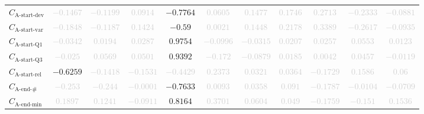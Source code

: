 \documentclass{standalone}
\newcommand{\startactivitiesrelname}{\text{A-start-rel}}
\newcommand{\startactivitiesrel}{C_{\startactivitiesrelname}}
\newcommand{\startdevname}{\text{A-start-dev}}
\newcommand{\startdev}{C_{\startdevname}}
\newcommand{\startvarname}{\text{A-start-var}}
\newcommand{\startvar}{C_{\startvarname}}
\newcommand{\startqonename}{\text{A-start-Q1}}
\newcommand{\startqone}{C_{\startqonename}}
\newcommand{\startqthreename}{\text{A-start-Q3}}
\newcommand{\startqthree}{C_{\startqthreename}}
\newcommand{\lastactivitiesname}{\text{A-end-\#}}
\newcommand{\lastactivities}{C_{\lastactivitiesname}}
\newcommand{\lastminname}{\text{A-end-min}}
\newcommand{\lastmin}{C_{\lastminname}}
\begin{document}
\begin{tabular}{lcccccccccc}
$\startdev$ & \textcolor{lightgray}{$-0.1467$} & \textcolor{lightgray}{$-0.1199$} & \textcolor{lightgray}{$0.0914$} & $-0.7764$ & \textcolor{lightgray}{$0.0605$} & \textcolor{lightgray}{$0.1477$} & \textcolor{lightgray}{$0.1746$} & \textcolor{lightgray}{$0.2713$} & \textcolor{lightgray}{$-0.2333$} & \textcolor{lightgray}{$-0.0881$} \\ 
$\startvar$ & \textcolor{lightgray}{$-0.1848$} & \textcolor{lightgray}{$-0.1187$} & \textcolor{lightgray}{$0.1424$} & $-0.59$ & \textcolor{lightgray}{$0.0021$} & \textcolor{lightgray}{$0.1448$} & \textcolor{lightgray}{$0.2178$} & \textcolor{lightgray}{$0.3389$} & \textcolor{lightgray}{$-0.2617$} & \textcolor{lightgray}{$-0.0935$} \\ 
$\startqone$ & \textcolor{lightgray}{$-0.0342$} & \textcolor{lightgray}{$0.0194$} & \textcolor{lightgray}{$0.0287$} & $0.9754$ & \textcolor{lightgray}{$-0.0996$} & \textcolor{lightgray}{$-0.0315$} & \textcolor{lightgray}{$0.0207$} & \textcolor{lightgray}{$0.0257$} & \textcolor{lightgray}{$0.0553$} & \textcolor{lightgray}{$0.0123$} \\ 
$\startqthree$ & \textcolor{lightgray}{$-0.025$} & \textcolor{lightgray}{$0.0569$} & \textcolor{lightgray}{$0.0501$} & $0.9392$ & \textcolor{lightgray}{$-0.172$} & \textcolor{lightgray}{$-0.0879$} & \textcolor{lightgray}{$0.0185$} & \textcolor{lightgray}{$0.0042$} & \textcolor{lightgray}{$0.0457$} & \textcolor{lightgray}{$-0.0119$} \\ 
$\startactivitiesrel$ & $-0.6259$ & \textcolor{lightgray}{$-0.1418$} & \textcolor{lightgray}{$-0.1531$} & \textcolor{lightgray}{$-0.4429$} & \textcolor{lightgray}{$0.2373$} & \textcolor{lightgray}{$0.0321$} & \textcolor{lightgray}{$0.0364$} & \textcolor{lightgray}{$-0.1729$} & \textcolor{lightgray}{$0.1586$} & \textcolor{lightgray}{$0.06$} \\ 
$\lastactivities$ & \textcolor{lightgray}{$-0.253$} & \textcolor{lightgray}{$-0.244$} & \textcolor{lightgray}{$-0.0001$} & $-0.7633$ & \textcolor{lightgray}{$0.0093$} & \textcolor{lightgray}{$0.0358$} & \textcolor{lightgray}{$0.091$} & \textcolor{lightgray}{$-0.1787$} & \textcolor{lightgray}{$-0.0104$} & \textcolor{lightgray}{$-0.0709$} \\ 
$\lastmin$ & \textcolor{lightgray}{$0.1897$} & \textcolor{lightgray}{$0.1241$} & \textcolor{lightgray}{$-0.0911$} & $0.8164$ & \textcolor{lightgray}{$0.3701$} & \textcolor{lightgray}{$0.0604$} & \textcolor{lightgray}{$0.049$} & \textcolor{lightgray}{$-0.1759$} & \textcolor{lightgray}{$-0.151$} & \textcolor{lightgray}{$0.1536$} \\ 

\end{tabular}
\end{document}
